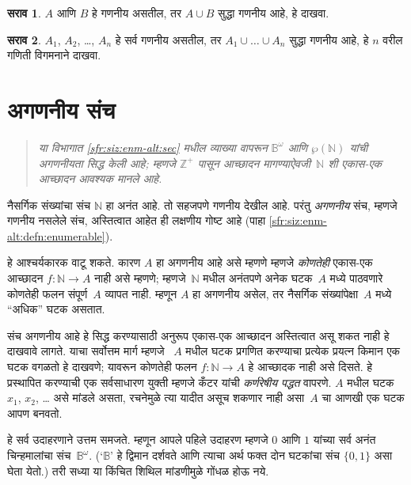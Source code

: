 \documentclass[11pt,a4paper,openany]{book}
\theoremstyle{definition}
\newtheorem{prob}{सराव}[chapter]
\newenvironment{explain}{}{}
\newcommand{\Pow}[1]{\wp(#1)}
\newcommand{\Nat}{\mathbb{N}}
\newcommand{\PosInt}{\mathbb{Z}^{+}}
\newcommand{\Bin}{\mathbb{B}}
\newenvironment{editorial}{\begin{quote}\small\itshape}{\end{quote}}
\begin{document}
\begin{prob}
$A$ आणि $B$ हे गणनीय असतील, तर $A \cup B$ सुद्धा गणनीय
आहे, हे दाखवा.
\end{prob}

\begin{prob}
$A_1$, $A_2$, \dots, $A_n$ हे सर्व गणनीय असतील, तर
$A_1 \cup \dots \cup A_n$ सुद्धा गणनीय आहे, हे $n$ वरील गणिती विगमनाने
दाखवा.
\end{prob}









\section{अगणनीय संच}\label{sfr:siz:nen-alt:sec}

\begin{editorial}
  या विभागात \ref{sfr:siz:enm-alt:sec} मधील व्याख्या वापरून
  $\Bin^\omega$ आणि $\Pow{\Nat}$ यांची अगणनीयता सिद्ध केली आहे;
  म्हणजे $\PosInt$ पासून आच्छादन मागण्याऐवजी~$\Nat$ शी एकास-एक
  आच्छादन आवश्यक मानले आहे.
\end{editorial}

\begin{explain}
नैसर्गिक संख्यांचा संच $\Nat$ हा अनंत आहे. तो सहजपणे
गणनीय देखील आहे. परंतु
\emph{अगणनीय} संच, म्हणजे गणनीय नसलेले संच,
अस्तित्वात आहेत ही लक्षणीय गोष्ट आहे
(पाहा \ref{sfr:siz:enm-alt:defn:enumerable}).

हे आश्चर्यकारक वाटू शकते. कारण $A$ हा अगणनीय आहे असे
म्हणणे म्हणजे \emph{कोणतेही} एकास-एक आच्छादन $f \colon \Nat \to A$
नाही असे म्हणणे; म्हणजे~$\Nat$ मधील अनंतपणे अनेक घटक~$A$
मध्ये पाठवणारे कोणतेही फलन संपूर्ण~$A$ व्यापत नाही. म्हणून $A$ हा
अगणनीय असेल, तर नैसर्गिक संख्यांपेक्षा~$A$ मध्ये ``अधिक''
घटक असतात.

संच अगणनीय आहे हे सिद्ध करण्यासाठी अनुरूप एकास-एक आच्छादन
अस्तित्वात असू शकत नाही हे दाखवावे लागते. याचा सर्वोत्तम मार्ग म्हणजे
~$A$ मधील घटक प्रगणित करण्याचा प्रत्येक प्रयत्न किमान एक
घटक वगळतो हे दाखवणे; यावरून कोणतेही फलन $f\colon \Nat \to A$
हे आच्छादक नाही असे दिसते. हे प्रस्थापित करण्याची एक सर्वसाधारण
युक्ती म्हणजे कँटर यांची \emph{कर्णरेषीय पद्धत} वापरणे. $A$ मधील
घटक $x_1$, $x_2$, \dots{} असे मांडले असता, रचनेमुळे त्या
यादीत असूच शकणार नाही असा~$A$ चा आणखी एक घटक आपण बनवतो.

हे सर्व उदाहरणाने उत्तम समजते. म्हणून आपले पहिले उदाहरण म्हणजे $0$
आणि $1$ यांच्या सर्व अनंत चिन्हमालांचा संच~$\Bin^\omega$. (`$\Bin$'
हे द्विमान दर्शवते आणि त्याचा अर्थ फक्त दोन घटकांचा संच $\{0,1\}$
असा घेता येतो.)
तरी सध्या या किंचित शिथिल मांडणीमुळे गोंधळ होऊ नये.
\end{explain}
\end{document}
